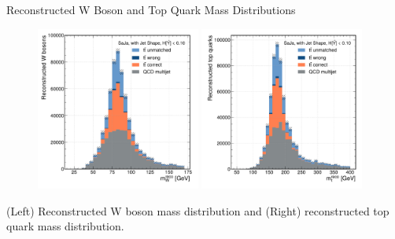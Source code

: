 \begin{frame}[fragile]{Reconstructed W Boson and Top Quark Mass Distributions}
    \begin{figure}
        \centering
        \includegraphics[width=0.48\textwidth]{fig/reco/w-mass_entropy-cut-0.10.pdf}
        \includegraphics[width=0.48\textwidth]{fig/reco/top-mass_entropy-cut-0.10.pdf}
    \end{figure}
    (Left) Reconstructed W boson mass distribution and (Right) reconstructed top quark mass distribution.
\end{frame}

